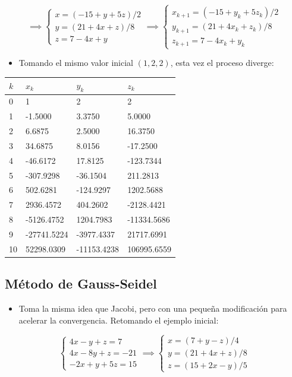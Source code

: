 \documentclass[]{book}
\providecommand{\tightlist}{%
  \setlength{\itemsep}{0pt}\setlength{\parskip}{0pt}}
\begin{document}
\[
\implies
\begin{cases} 
x=(-15+y+5z)/2 \\
y=(21+4x+z)/8 \\
z=7-4x+y
\end{cases}
\implies
\begin{cases} 
x_{k+1}=(-15+y_k+5z_k)/2 \\
y_{k+1}=(21+4x_k+z_k)/8 \\
z_{k+1}=7-4x_k+y_k
\end{cases}
\]

\begin{itemize}
\tightlist
\item
  Tomando el mismo valor inicial \((1, 2, 2)\), esta vez el proceso diverge:
\end{itemize}

\begin{longtable}[]{@{}llll@{}}
\toprule
\(k\) & \(x_k\) & \(y_k\) & \(z_k\)\tabularnewline
\midrule
\endhead
0 & 1 & 2 & 2\tabularnewline
1 & -1.5000 & 3.3750 & 5.0000\tabularnewline
2 & 6.6875 & 2.5000 & 16.3750\tabularnewline
3 & 34.6875 & 8.0156 & -17.2500\tabularnewline
4 & -46.6172 & 17.8125 & -123.7344\tabularnewline
5 & -307.9298 & -36.1504 & 211.2813\tabularnewline
6 & 502.6281 & -124.9297 & 1202.5688\tabularnewline
7 & 2936.4572 & 404.2602 & -2128.4421\tabularnewline
8 & -5126.4752 & 1204.7983 & -11334.5686\tabularnewline
9 & -27741.5224 & -3977.4337 & 21717.6991\tabularnewline
10 & 52298.0309 & -11153.4238 & 106995.6559\tabularnewline
\bottomrule
\end{longtable}

\hypertarget{muxe9todo-de-gauss-seidel}{%
\subsection{Método de Gauss-Seidel}\label{muxe9todo-de-gauss-seidel}}

\begin{itemize}
\tightlist
\item
  Toma la misma idea que Jacobi, pero con una pequeña modificación para acelerar la convergencia. Retomando el ejemplo inicial:
\end{itemize}

\[
\begin{cases} 
4x-y+z=7 \\
4x-8y+z=-21 \\
-2x+y+5z=15
\end{cases}
\implies
\begin{cases} 
x=(7+y-z)/4 \\
y=(21+4x+z)/8 \\
z=(15+2x-y)/5
\end{cases}
\]
\end{document}
